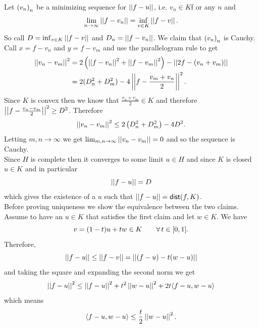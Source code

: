 \documentclass{article}
\begin{document}
\begin{fancyproof}
	Let ${\left({v}_{n}\right)}_{n}$ be a minimizing sequence for $\left|\left|f-u\right|\right|$, i.e. $v_{n}\in K$f or any $n$ and
	\begin{equation*}
		\lim_{n\to\infty}\left|\left|f-v_{n}\right|\right|=\inf_{v\in K}\left|\left|f-v\right|\right|.
	\end{equation*}
	So call $D=\inf_{v\in K}\left|\left|f-v\right|\right|$ and $D_{n}=\left|\left|f-v_{n}\right|\right|$. We claim that ${\left({v}_{n}\right)}_{n}$ is Cauchy. Call $x=f-v_{n}$ and $y=f-v_{m}$ and use the parallelogram rule to get
	\begin{align*}
		\left|\left|v_{n}-v_{m}\right|\right|^{2}&=2\left(\left|\left|f-v_{n}\right|\right|^{2}+\left|\left|f-v_{m}\right|\right|^{2}\right)-\left|\left|2f-(v_{n}+v_{m})\right|\right|\\
		&=2(D_{n}^{2}+D_{m}^{2})-4\left|\left|f-\frac{v_{m}+v_{n}}{2}\right|\right|^{2}.
	\end{align*}
	Since $K$ is convex then we know that $\frac{v_{n}+v_{m}}{2}\in K$ and therefore $\left|\left|f-\frac{v_{n}-v_{m}}{2}\right|\right|^{2}\geq D^{2}$. Therefore
	\begin{equation*}
		\left|\left|v_{n}-v_{m}\right|\right|^{2}\leq 2\left(D_{n}^{2}+D_{m}^{2}\right)-4D^{2}.
	\end{equation*}
	Letting $m,n\to\infty$ we get $\lim_{m,n\to\infty}\left|\left|v_{n}-v_{m}\right|\right|=0$ and so the sequence is Cauchy.\\
	Since $H$ is complete then it converges to some limit $u\in H$ and since $K$ is closed $u\in K$ and in particular \\
	\begin{equation*}
		\left|\left|f-u\right|\right|=D
	\end{equation*}
	which gives the existence of a $u$ such that $\left|\left|f-u\right|\right|=\mathsf{dist}(f,K)$. \\
	Before proving uniqueness we show the equivalence between the two claims. Assume to have an $u\in K$ that satisfies the first claim and let $w\in K$. We have
	\begin{equation*}
		v=(1-t)u+tw\in K\qquad\forall\, t\in[0,1].
	\end{equation*}
	Therefore,
	\begin{equation*}
		\left|\left|f-u\right|\right|\leq\left|\left|f-v\right|\right|=\left|\left|(f-u)-t(w-u)\right|\right|
	\end{equation*}
	and taking the square and expanding the second norm we get
	\begin{equation*}
		\left|\left|f-u\right|\right|^{2}\leq\left|\left|f-u\right|\right|^{2}+t^{2}\left|\left|w-u\right|\right|^{2}+2t\langle f-u,w-u \rangle
	\end{equation*}
	which means
	\begin{equation*}
		\langle f-u,w-u \rangle\leq\frac{t}{2}\left|\left|w-u\right|\right|^{2}.
	\end{equation*}

\end{fancyproof}
\end{document}
